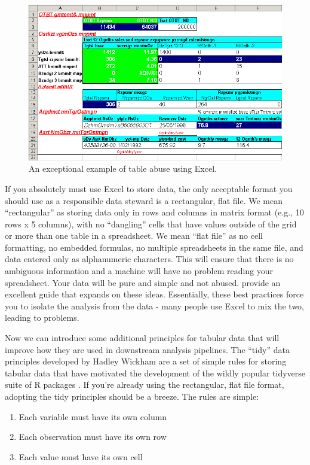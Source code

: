 \documentclass[
]{book}
\providecommand{\tightlist}{%
  \setlength{\itemsep}{0pt}\setlength{\parskip}{0pt}}
\begin{document}
\begin{figure}

{\centering \includegraphics[width=0.8\linewidth]{img/excel_bad} 

}

\caption{An exceptional example of table abuse using Excel.}\label{fig:excelbad}
\end{figure}

If you absolutely must use Excel to store data, the only acceptable format you should use as a responsible data steward is a rectangular, flat file. We mean ``rectangular'' as storing data only in rows and columns in matrix format (e.g., 10 rows x 5 columns), with no ``dangling'' cells that have values outside of the grid or more than one table in a spreadsheet. We mean ``flat file'' as no cell formatting, no embedded formulas, no multiple spreadsheets in the same file, and data entered only as alphanumeric characters. This will ensure that there is no ambiguous information and a machine will have no problem reading your spreadsheet. Your data will be pure and simple and not abused. \citet{Broman18} provide an excellent guide that expands on these ideas. Essentially, these best practices force you to isolate the analysis from the data - many people use Excel to mix the two, leading to problems.

Now we can introduce some additional principles for tabular data that will improve how they are used in downstream analysis pipelines. The ``tidy'' data principles developed by Hadley Wickham \citep{Wickham14c} are a set of simple rules for storing tabular data that have motivated the development of the wildly popular tidyverse suite of R packages \citep{Wickham19}. If you're already using the rectangular, flat file format, adopting the tidy principles should be a breeze. The rules are simple:

\begin{enumerate}
\def\labelenumi{\arabic{enumi}.}
\tightlist
\item
  Each variable must have its own column
\item
  Each observation must have its own row
\item
  Each value must have its own cell
\end{enumerate}
\end{document}
